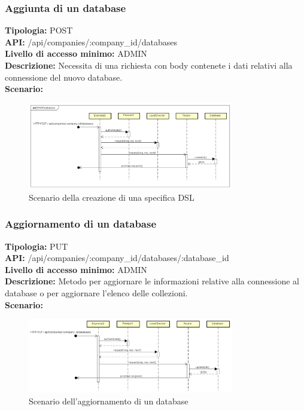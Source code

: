 \newpage
\subsubsection{Aggiunta di un database}
\textbf{Tipologia:} POST \\
\textbf{API:} /api/companies/:company\_id/databases \\
\textbf{Livello di accesso minimo:} ADMIN \\
\textbf{Descrizione:} Necessita di una richiesta con body contenete i dati relativi alla connessione del nuovo database. \\
\textbf{Scenario:}
\begin{figure}[h]
\centering
\includegraphics[width=0.8\textwidth]{res/sections/backend/(POST)database.png}
\caption{Scenario della creazione di una specifica DSL}
\end{figure}

\newpage
\subsubsection{Aggiornamento di un database}
\textbf{Tipologia:} PUT \\
\textbf{API:} /api/companies/:company\_id/databases/:database\_id \\
\textbf{Livello di accesso minimo:} ADMIN \\
\textbf{Descrizione:} Metodo per aggiornare le informazioni relative alla connessione al database o per aggiornare l'elenco delle collezioni. \\
\textbf{Scenario:}
\begin{figure}[h]
\centering
\includegraphics[width=0.8\textwidth]{res/sections/backend/(PUT)database.png}
\caption{Scenario dell'aggiornamento di un database}
\end{figure}

